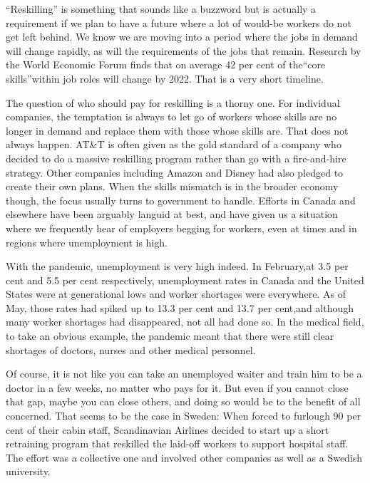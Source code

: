 ``Reskilling'' is something that sounds like a buzzword but is actually a requirement if we plan to have a future where a lot of would-be workers do not get left behind. We know we are moving into a period where the jobs in demand will change rapidly, as will the requirements of the jobs that remain. Research by the World Economic Forum finds that on average 42 per cent of the``core skills''within job roles will change by 2022. That is a very short timeline.


The question of who should pay for reskilling is a thorny one. For individual companies, the temptation is always to let go of workers whose skills are no longer in demand and replace them with those whose skills are. That does not always happen. AT\&T is often given as the gold standard of a company who decided to do a massive reskilling program rather than go with a fire-and-hire strategy. Other companies including Amazon and Disney had also pledged to create their own plans. When the skills mismatch is in the broader economy though, the focus usually turns to government to handle. Efforts in Canada and elsewhere have been arguably languid at best, and have given us a situation where we frequently hear of employers begging for workers, even at times and in regions where unemployment is high.


With the pandemic, unemployment is very high indeed. In February,at 3.5 per cent and 5.5 per cent respectively, unemployment rates in Canada and the United States were at generational lows and worker shortages were everywhere. As of May, those rates had spiked up to 13.3 per cent and 13.7 per cent,and although many worker shortages had disappeared, not all had done so. In the medical field, to take an obvious example, the pandemic meant that there were still clear shortages of doctors, nurses and other medical personnel.


Of course, it is not like you can take an unemployed waiter and train him to be a doctor in a few weeks, no matter who pays for it. But even if you cannot close that gap, maybe you can close others, and doing so would be to the benefit of all concerned. That seems to be the case in Sweden: When forced to furlough 90 per cent of their cabin staff, Scandinavian Airlines decided to start up a short retraining program that reskilled the laid-off workers to support hospital staff. The effort was a collective one and involved other companies as well as a Swedish university.


